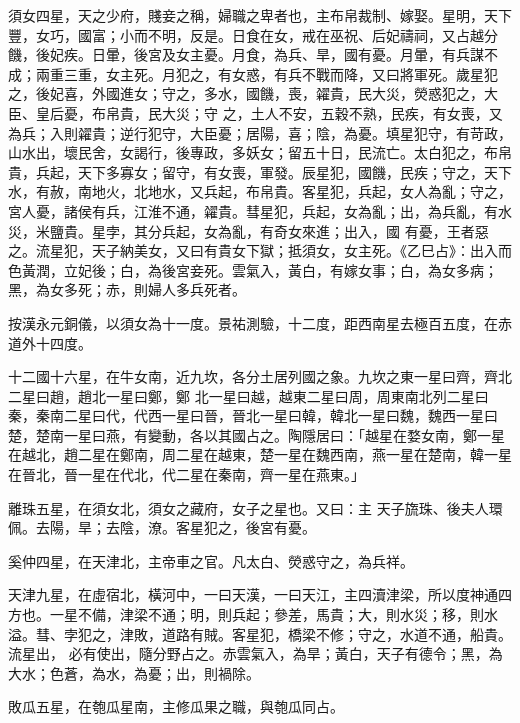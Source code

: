 \begin{pinyinscope}
 須女四星，天之少府，賤妾之稱，婦職之卑者也，主布帛裁制、嫁娶。星明，天下豐，女巧，國富；小而不明，反是。日食在女，戒在巫祝、后妃禱祠，又占越分饑，後妃疾。日暈，後宮及女主憂。月食，為兵、旱，國有憂。月暈，有兵謀不成；兩重三重，女主死。月犯之，有女惑，有兵不戰而降，又曰將軍死。歲星犯之，後妃喜，外國進女；守之，多水，國饑，喪，糴貴，民大災，熒惑犯之，大臣、皇后憂，布帛貴，民大災；守
 之，土人不安，五穀不熟，民疾，有女喪，又為兵；入則糴貴；逆行犯守，大臣憂；居陽，喜；陰，為憂。填星犯守，有苛政，山水出，壞民舍，女謁行，後專政，多妖女；留五十日，民流亡。太白犯之，布帛貴，兵起，天下多寡女；留守，有女喪，軍發。辰星犯，國饑，民疾；守之，天下水，有赦，南地火，北地水，又兵起，布帛貴。客星犯，兵起，女人為亂；守之，宮人憂，諸侯有兵，江淮不通，糴貴。彗星犯，兵起，女為亂；出，為兵亂，有水災，米鹽貴。星孛，其分兵起，女為亂，有奇女來進；出入，國
 有憂，王者惡之。流星犯，天子納美女，又曰有貴女下獄；抵須女，女主死。《乙巳占》：出入而色黃潤，立妃後；白，為後宮妾死。雲氣入，黃白，有嫁女事；白，為女多病；黑，為女多死；赤，則婦人多兵死者。



 按漢永元銅儀，以須女為十一度。景祐測驗，十二度，距西南星去極百五度，在赤道外十四度。



 十二國十六星，在牛女南，近九坎，各分土居列國之象。九坎之東一星曰齊，齊北二星曰趙，趙北一星曰鄭，鄭
 北一星曰越，越東二星曰周，周東南北列二星曰秦，秦南二星曰代，代西一星曰晉，晉北一星曰韓，韓北一星曰魏，魏西一星曰楚，楚南一星曰燕，有變動，各以其國占之。陶隱居曰：「越星在婺女南，鄭一星在越北，趙二星在鄭南，周二星在越東，楚一星在魏西南，燕一星在楚南，韓一星在晉北，晉一星在代北，代二星在秦南，齊一星在燕東。」



 離珠五星，在須女北，須女之藏府，女子之星也。又曰：主
 天子旒珠、後夫人環佩。去陽，旱；去陰，潦。客星犯之，後宮有憂。



 奚仲四星，在天津北，主帝車之官。凡太白、熒惑守之，為兵祥。



 天津九星，在虛宿北，橫河中，一曰天漢，一曰天江，主四瀆津梁，所以度神通四方也。一星不備，津梁不通；明，則兵起；參差，馬貴；大，則水災；移，則水溢。彗、孛犯之，津敗，道路有賊。客星犯，橋梁不修；守之，水道不通，船貴。流星出，
 必有使出，隨分野占之。赤雲氣入，為旱；黃白，天子有德令；黑，為大水；色蒼，為水，為憂；出，則禍除。



 敗瓜五星，在匏瓜星南，主修瓜果之職，與匏瓜同占。




\end{pinyinscope}
